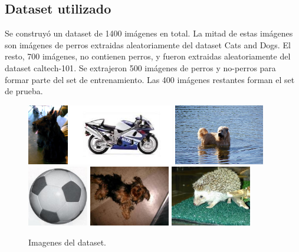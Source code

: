 \documentclass[12pt]{article}
\begin{document}
\subsection{Dataset utilizado}

Se construyó un dataset de 1400 imágenes en total. La mitad de estas imágenes
son imágenes de perros extraidas aleatoriamente del dataset Cats and Dogs\cite{parkhi12a}.  El
resto, 700 imágenes, no contienen perros, y fueron extraidas aleatoriamente del
dataset caltech-101\cite{caltech101}.  Se extrajeron 500 imágenes de perros y no-perros para
formar parte del set de entrenamiento.  Las 400 imágenes restantes forman el set
de prueba.

\begin{figure}[H]
    \centering
\includegraphics[height=100px]{../dogs/eval/20.jpg}
\includegraphics[height=100px]{../no-dogs/eval/43.jpg}
\includegraphics[height=100px]{../dogs/eval/134.jpg}
\includegraphics[height=100px]{../no-dogs/eval/167.jpg}
\includegraphics[height=100px]{../dogs/eval/78.jpg}
\includegraphics[height=100px]{../no-dogs/eval/145.jpg}
    \caption{Imagenes del dataset.}
\end{figure}
\end{document}
